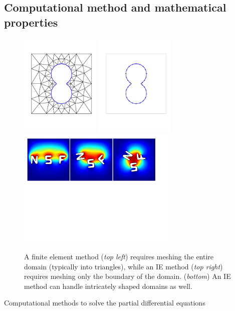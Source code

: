 \subsection{Computational method and mathematical properties}
\begin{figure}
  \vspace{-8pt}
  \centering
  \includegraphics[width=1.5in]{figures/Background/Peanut/PeanutFEM.pdf}
  \includegraphics[width=1.5in]{figures/Background/Peanut/PeanutIE.pdf}\\
  \includegraphics[width=3in]{figures/Background/NSF.pdf}\\
\caption{\label{fig:fem_vs_bie} \footnotesize A finite element method
  ({\em top left}) requires meshing the entire domain (typically into
  triangles), while an IE method ({\em top right}) requires meshing only
  the boundary of the domain.  ({\em bottom}) An IE method can handle
  intricately shaped domains as well.}
\end{figure}
Computational methods to solve the partial differential equations
